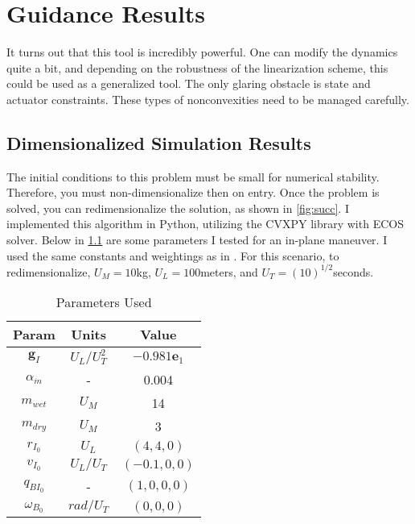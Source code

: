 \chapter{Guidance Results}
\label{results}



It turns out that this tool is incredibly powerful. One can modify the dynamics quite a bit, and depending on the robustness of the linearization scheme, this could be used as a generalized tool. The only glaring obstacle is state and actuator constraints. These types of nonconvexities need to be managed carefully.



\section{Dimensionalized Simulation Results}
The initial conditions to this problem must be small for numerical stability. Therefore, you must non-dimensionalize then on entry. Once the problem is solved, you can redimensionalize the solution, as shown in \ref{fig:succ}. I implemented this algorithm in Python, utilizing the CVXPY library with ECOS solver. Below in \ref{table:nonlin} are some parameters I tested for an in-plane maneuver. I used the same constants and weightings as in \cite{6dofsucc}. For this scenario, to redimensionalize, $U_M = 10$kg, $U_L=100$meters, and $U_T = (10)^{1/2}$seconds.

\begin{table}[ht]
\caption{Parameters Used}
\centering 
\begin{tabular}{c c c} 
\hline\hline
Param & Units & Value \\ [0.5ex] 
\hline 
$\mathbf{g}_I$ 		& $U_L/U_T^2$ 	& $-0.981\mathbf{e}_1$ 		\\ 
$\alpha_{\dot{m}}$ 	& - 			& 0.004 							\\
$m_{wet}$ 			& $U_M$ 		& 14		 					\\
$m_{dry}$ 			& $U_M$ 		& 3  						\\
$r_{I_0}$ 			& $U_L$ 		& $(4,4,0)$ 							\\
$v_{I_0}$ 			& $U_L/U_T$	 	& $(-0.1,0,0)$ 							\\
$q_{{BI}_0}$ 		& - 			& $(1,0,0,0)$ 							\\
$\omega_{B_0}$ 		& $rad/U_T$ 			& $(0,0,0)$ 							\\[1ex] 
\hline
\end{tabular}
\label{table:nonlin}
\end{table}


